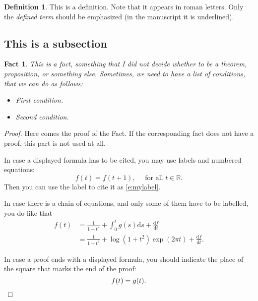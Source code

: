 \documentclass[12pt]{amsbook}
\newtheorem{fact}[theorem]{Fact}
\theoremstyle{definition}
\newtheorem{definition}[theorem]{Definition}
\newcommand{\RR}{{\mathbb R}}
\newcommand{\de}{\mathrm{d}} %
\begin{document}
\begin{definition} This is a definition. Note that it appears in roman
  letters. Only the \emph{defined term} should be emphasized (in the
  manuscript it is underlined).
\end{definition}

\subsection{This is a subsection}

\begin{fact} This is a fact, something that I did not decide whether to be a
  theorem, proposition, or something else. Sometimes, we need to have a list
  of
conditions, that we can do as follows:
\begin{itemize}
\item[(i)] First condition.
\item[(ii)] Second condition.
\end{itemize}
\end{fact}

\begin{proof} Here comes the proof of the Fact. If the corresponding fact does
  not have a proof, this part is not used at all.

In case a displayed formula has to be cited, you may use labels and numbered
equations:
\begin{equation}\label{e:mylabel} f(t)=f(t+1),\quad\mbox{ for all }t\in\RR.
\end{equation}
Then you can use the label to cite it as \eqref{e:mylabel}.

In case there is a chain of equations, and only some of them have to be
labelled, you do like that
\begin{align}
f(t) & = \frac{1}{1+t^2}+\int_0^t g(s)\de s+ \frac{\de f}{\de t} \nonumber \\
& = \frac{1}{1+t^2}+ \log(1+t^2)\exp(2\pi t)+ \frac{\de f}{\de
  t}.\label{e:label} 
\end{align}

In case a proof ends with a displayed formula, you should indicate the place
of the square that marks the end of the proof:
\begin{equation*}
f(t) =g (t).\qedhere
\end{equation*}
\end{proof}
\end{document}
